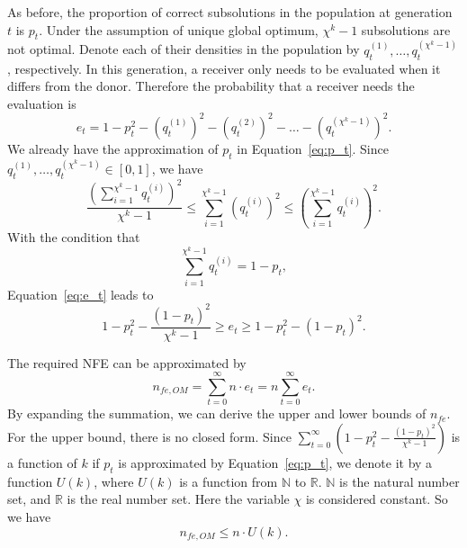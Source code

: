 \documentclass{sig-alternate}
\begin{document}
As before, the proportion of correct subsolutions in the population at generation $t$ is $p_t$.
Under the assumption of unique global optimum,
$\chi^k-1$ subsolutions are not optimal.
Denote each of their densities in the population by $q^{(1)}_t, \dots, q^{(\chi^k-1)}_t$, respectively.
In this generation, a receiver only needs to be evaluated when it differs from the donor.
Therefore the probability that a receiver needs the evaluation is
\begin{equation}\label{eq:e_t}
e_t = 1-p_t^2-\left(q^{\left(1\right)}_t\right)^2-\left(q^{\left(2\right)}_t\right)^2-\dots-\left(q^{\left(\chi^k-1\right)}_t\right)^2.
\end{equation}
We already have the approximation of $p_t$ in Equation~\ref{eq:p_t}.
Since $q^{(1)}_t, \dots, q^{(\chi^k-1)}_t\in [0,1]$, we have
\begin{equation*}
\frac{\left(\sum\limits_{i=1}^{\chi^k-1} q_t^{\left(i\right)} \right)^2}{\chi^k-1}
    \leq \sum\limits_{i=1}^{\chi^k-1} \left(q_t^{(i)}\right)^2
    \leq \left(\sum\limits_{i=1}^{\chi^k-1} q_t^{(i)}\right)^2.
\end{equation*}
With the condition that
\begin{equation*}
\sum\limits_{i=1}^{\chi^k-1} q_t^{(i)} = 1-p_t,
\end{equation*}
Equation~\ref{eq:e_t} leads to
\begin{equation}\label{eq:UL}
1-p_t^2-\frac{\left(1-p_t\right)^2}{\chi^k-1}
\geq e_t
\geq 1-p_t^2-\left(1-p_t\right)^2.
\end{equation}

The required NFE can be approximated by
\begin{equation*}
n_{fe,OM} = \sum\limits_{t=0}^{\infty} n\cdot e_t  = n \sum\limits_{t=0}^{\infty} e_t.
\end{equation*}
By expanding the summation, we can derive the upper and lower bounds of $n_{fe}$.
For the upper bound, there is no closed form.
Since 
$\sum\limits_{t=0}^{\infty}\left(1-p_t^2-\frac{\left(1-p_t\right)^2}{\chi^k-1}\right)$ is a function of $k$ if $p_t$ is approximated by Equation~\ref{eq:p_t},
we denote it by a function $U\left(k\right)$,
where $U\left(k\right)$ is a function from $\mathbb{N}$ to $\mathbb{R}$.
$\mathbb{N}$ is the natural number set, and $\mathbb{R}$ is the real number set.
Here the variable $\chi$ is considered constant.
So we have
\begin{equation*}
n_{fe,OM} \leq n\cdot U\left(k\right).
\end{equation*}
\end{document}
